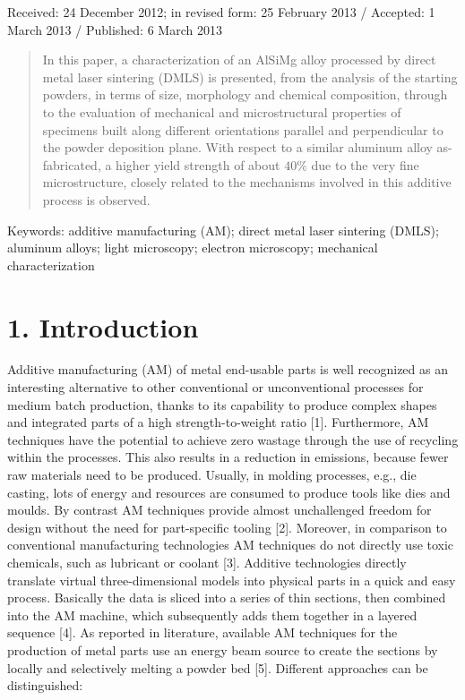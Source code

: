 \documentclass[10pt]{article}
\begin{document}
Received: 24 December 2012; in revised form: 25 February 2013 / Accepted: 1 March 2013 / Published: 6 March 2013

\begin{abstract}
In this paper, a characterization of an AlSiMg alloy processed by direct metal laser sintering (DMLS) is presented, from the analysis of the starting powders, in terms of size, morphology and chemical composition, through to the evaluation of mechanical and microstructural properties of specimens built along different orientations parallel and perpendicular to the powder deposition plane. With respect to a similar aluminum alloy as-fabricated, a higher yield strength of about $40 \%$ due to the very fine microstructure, closely related to the mechanisms involved in this additive process is observed.
\end{abstract}

Keywords: additive manufacturing (AM); direct metal laser sintering (DMLS); aluminum alloys; light microscopy; electron microscopy; mechanical characterization

\section*{1. Introduction}
Additive manufacturing (AM) of metal end-usable parts is well recognized as an interesting alternative to other conventional or unconventional processes for medium batch production, thanks to its capability to produce complex shapes and integrated parts of a high strength-to-weight ratio [1]. Furthermore, AM techniques have the potential to achieve zero wastage through the use of recycling within the processes. This also results in a reduction in emissions, because fewer raw materials need to be produced. Usually, in molding processes, e.g., die casting, lots of energy and resources are consumed to produce tools like dies and moulds. By contrast AM techniques provide almost unchallenged freedom for design without the need for part-specific tooling [2]. Moreover, in comparison to conventional manufacturing technologies AM techniques do not directly use toxic chemicals, such as lubricant or coolant [3]. Additive technologies directly translate virtual three-dimensional models into physical parts in a quick and easy process. Basically the data is sliced into a series of thin sections, then combined into the AM machine, which subsequently adds them together in a layered sequence [4]. As reported in literature, available AM techniques for the production of metal parts use an energy beam source to create the sections by locally and selectively melting a powder bed [5]. Different approaches can be distinguished:
\end{document}
